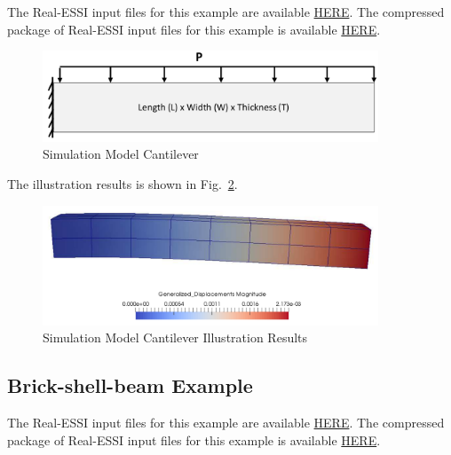 The Real-ESSI input files for this example are available 
\href{https://github.com/yuan-energy/Real-ESSI-Short-Course-Examples/blob/master/short-course-examples/Day1/Preprocess_examples_with_Gmsh/cantilever}{HERE}. 
The compressed package of Real-ESSI input files for this example is available 
\href{https://github.com/yuan-energy/Real-ESSI-Short-Course-Examples/blob/master/short-course-examples/Day1/Preprocess_examples_with_Gmsh/cantilever/cantilever.tgz?raw=true}{HERE}. 


\begin{figure}[H]
  \centering
  \includegraphics[width = 10cm]{./Figure-files/Day1/Preprocess_examples_with_Gmsh/example1/overview.png}
  \caption{Simulation Model Cantilever}
  \label{fig_gmsh_ex1}
\end{figure}


The illustration results is shown in Fig.~\ref{fig_day1_gmsh_ex_cantilever_results}.

\begin{figure}[H]
  \centering
  \includegraphics[width = 10cm]{./Figure-files/Day1/Preprocess_examples_with_Gmsh/example1/cantilever_results.png}
  \caption{Simulation Model Cantilever Illustration Results }
  \label{fig_day1_gmsh_ex_cantilever_results}
\end{figure}




\clearpage
\newpage
\subsection{Brick-shell-beam Example}

The Real-ESSI input files for this example are available 
\href{https://github.com/yuan-energy/Real-ESSI-Short-Course-Examples/blob/master/short-course-examples/Day1/Preprocess_examples_with_Gmsh/brick-shell-beam}{HERE}. 
The compressed package of Real-ESSI input files for this example is available 
\href{https://github.com/yuan-energy/Real-ESSI-Short-Course-Examples/blob/master/short-course-examples/Day1/Preprocess_examples_with_Gmsh/brick-shell-beam/brick-shell-beam.tgz?raw=true}{HERE}. 



